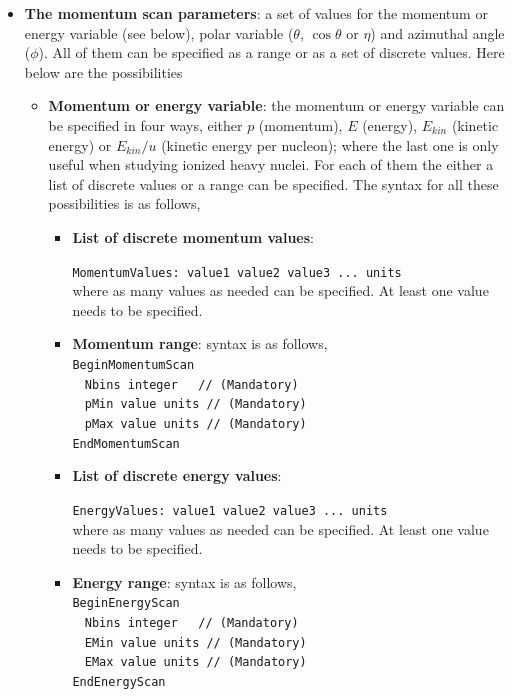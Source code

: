 \begin{itemize}
 
 \item {\bf The momentum scan parameters}: a set of values for the momentum or energy variable (see below), polar variable ($\theta$, $\cos\theta$ or $\eta$) and azimuthal angle ($\phi$). 
 All of them can be specified as a range or as a set of discrete values. Here below are the possibilities
 \begin{itemize}
   \item {\bf Momentum or energy variable}: the momentum or energy variable can be specified in four ways, either $p$ (momentum), $E$ (energy), $E_{kin}$ (kinetic energy) or $E_{kin}/u$ 
   (kinetic energy per nucleon); where the last one is only useful when studying ionized heavy nuclei. For each of them the either a list of discrete values or 
   a range can be specified. The syntax for all these possibilities is as follows,
   
   \begin{itemize}
     \item {\bf List of discrete momentum values}:
     
     \noindent
     {\tt MomentumValues: value1  value2  value3 ... units } \\
     \noindent
     where as many values as needed can be specified. At least one value needs to be specified.
     ~\\
     
     \item {\bf Momentum range}: syntax is as follows,
     ~\\
     \noindent     
     {\tt BeginMomentumScan} \\
     $~~~~${\tt Nbins   integer $~~$ // (Mandatory)} \\
     $~~~~${\tt pMin    value units  // (Mandatory)} \\
     $~~~~${\tt pMax    value units  // (Mandatory)} \\
     {\tt EndMomentumScan}
     ~\\
     
     \item {\bf List of discrete energy values}:
     
     \noindent
     {\tt EnergyValues: value1  value2  value3 ... units } \\
     \noindent
     where as many values as needed can be specified. At least one value needs to be specified.
     ~\\
     
     \item {\bf Energy range}: syntax is as follows,
     ~\\
     \noindent     
     {\tt BeginEnergyScan} \\
     $~~~~${\tt Nbins   integer $~~$ // (Mandatory)} \\
     $~~~~${\tt EMin    value units  // (Mandatory)} \\
     $~~~~${\tt EMax    value units  // (Mandatory)} \\
     {\tt EndEnergyScan}
     ~\\
     

\end{itemize}
\end{itemize}
\end{itemize}
